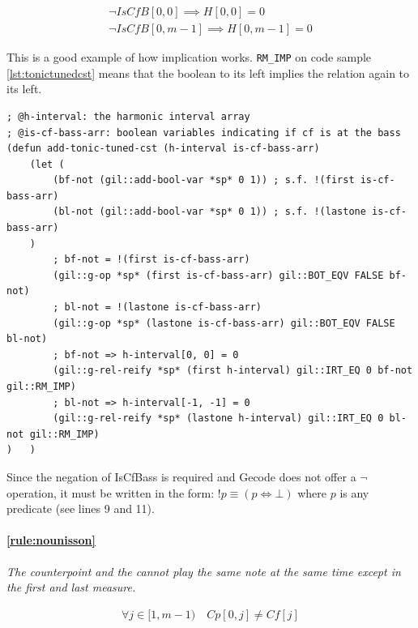 \begin{equation}
    \begin{gathered}
        \lnot IsCfB[0, 0] \implies H[0, 0] = 0\\
        \lnot IsCfB[0, m-1] \implies H[0, m-1] = 0
    \end{gathered}
\end{equation}

This is a good example of how implication works. {\small\texttt{RM\_IMP}} on code sample \ref{lst:tonictunedcst} means that the boolean to its left implies the relation again to its left.

\begin{lstlisting}[caption=Function that constrains the first and last harmonies to be unisons or octaves., label=lst:tonictunedcst, basicstyle=\ttfamily\scriptsize]
; @h-interval: the harmonic interval array
; @is-cf-bass-arr: boolean variables indicating if cf is at the bass
(defun add-tonic-tuned-cst (h-interval is-cf-bass-arr)
    (let (
        (bf-not (gil::add-bool-var *sp* 0 1)) ; s.f. !(first is-cf-bass-arr)
        (bl-not (gil::add-bool-var *sp* 0 1)) ; s.f. !(lastone is-cf-bass-arr)
    )
        ; bf-not = !(first is-cf-bass-arr)
        (gil::g-op *sp* (first is-cf-bass-arr) gil::BOT_EQV FALSE bf-not)
        ; bl-not = !(lastone is-cf-bass-arr)
        (gil::g-op *sp* (lastone is-cf-bass-arr) gil::BOT_EQV FALSE bl-not)
        ; bf-not => h-interval[0, 0] = 0
        (gil::g-rel-reify *sp* (first h-interval) gil::IRT_EQ 0 bf-not gil::RM_IMP)
        ; bl-not => h-interval[-1, -1] = 0
        (gil::g-rel-reify *sp* (lastone h-interval) gil::IRT_EQ 0 bl-not gil::RM_IMP)
)   )
\end{lstlisting}

Since the negation of IsCfBass is required and Gecode does not offer a $\lnot$ operation, it must be written in the form: $!p \equiv (p \iff \bot)$ where $p$ is any predicate (see lines 9 and 11).

\paragraph{\ref{rule:nounisson}} \textit{The counterpoint and the \cf cannot play the same note at the same time except in the first and last measure.}

\begin{equation}
    \begin{gathered}
        \forall j \in [1, m-1)\quad
        Cp[0, j] \neq Cf[j]
    \end{gathered}
\end{equation}

